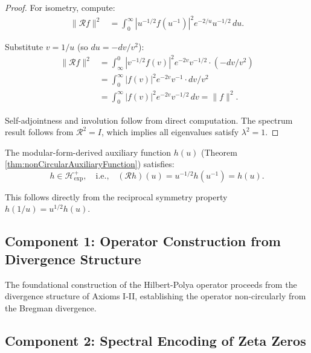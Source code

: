 \begin{theorem}
\begin{proof}
For isometry, compute:
\begin{align}
\|\mathcal{R}f\|^2 &= \int_0^\infty |u^{-1/2} f(u^{-1})|^2 e^{-2/u} u^{-1/2} \, du.
\end{align}

Substitute $v = 1/u$ (so $du = -dv/v^2$):
\begin{align}
\|\mathcal{R}f\|^2 &= \int_\infty^0 |v^{-1/2} f(v)|^2 e^{-2v} v^{-1/2} \cdot (-dv/v^2) \\
&= \int_0^\infty |f(v)|^2 e^{-2v} v^{-1} \cdot dv/v^2 \\
&= \int_0^\infty |f(v)|^2 e^{-2v} v^{-1/2} \, dv = \|f\|^2.
\end{align}

Self-adjointness and involution follow from direct computation. The spectrum result follows from $\mathcal{R}^2 = I$, which implies all eigenvalues satisfy $\lambda^2 = 1$.

\end{proof}

\end{theorem}

\begin{corollary}
\label{cor:auxiliaryFunctionSymmetric}

The modular-form-derived auxiliary function $h(u)$ (Theorem \ref{thm:nonCircularAuxiliaryFunction}) satisfies:
\begin{equation}
h \in \mathcal{H}_{\mathrm{exp}}^+, \quad \text{i.e.,} \quad (\mathcal{R}h)(u) = u^{-1/2}h(u^{-1}) = h(u).
\end{equation}

This follows directly from the reciprocal symmetry property $h(1/u) = u^{1/2} h(u)$.

\end{corollary}

\subsection{Component 1: Operator Construction from Divergence Structure}
\label{subsec:operatorConstruction}

The foundational construction of the Hilbert-Polya operator proceeds from the divergence structure of Axioms I-II, establishing the operator non-circularly from the Bregman divergence.



\subsection{Component 2: Spectral Encoding of Zeta Zeros}
\label{subsec:spectralEncoding}

